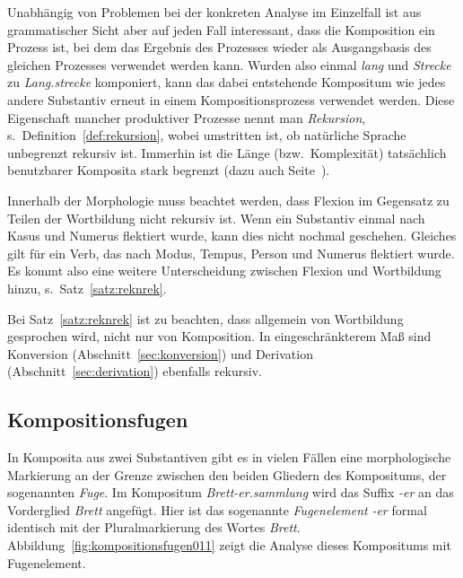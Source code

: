 Unabhängig von Problemen bei der konkreten Analyse im Einzelfall ist aus grammatischer Sicht aber auf jeden Fall interessant, dass die Komposition ein Prozess ist, bei dem das Ergebnis des Prozesses wieder als Ausgangsbasis des gleichen Prozesses verwendet werden kann.
Wurden also einmal \textit{lang} und \textit{Strecke} zu \textit{Lang.strecke} komponiert, kann das dabei entstehende Kompositum wie jedes andere Substantiv erneut in einem Kompositionsprozess verwendet werden.
Diese Eigenschaft mancher produktiver Prozesse nennt man \textit{Rekursion}, s.\ Definition~\ref{def:rekursion}, wobei umstritten ist, ob natürliche Sprache unbegrenzt rekursiv ist.
Immerhin ist die Länge (bzw.\ Komplexität) tatsächlich benutzbarer Komposita stark begrenzt (dazu auch Seite~\pageref{abs:syntaktischestruktur021}).


Innerhalb der Morphologie muss beachtet werden, dass Flexion im Gegensatz zu Teilen der Wortbildung nicht rekursiv ist.
Wenn ein Substantiv einmal nach Kasus und Numerus flektiert wurde, kann dies nicht nochmal geschehen.
Gleiches gilt für ein Verb, das nach Modus, Tempus, Person und Numerus flektiert wurde.
Es kommt also eine weitere Unterscheidung zwischen Flexion und Wortbildung hinzu, s.\ Satz~\ref{satz:reknrek}.


Bei Satz~\ref{satz:reknrek} ist zu beachten, dass allgemein von Wortbildung gesprochen wird, nicht nur von Komposition.
In eingeschränkterem Maß sind Konversion (Abschnitt~\ref{sec:konversion}) und Derivation (Abschnitt~\ref{sec:derivation}) ebenfalls rekursiv.

\subsection{Kompositionsfugen}
\label{sec:kompositionsfugen}


In Komposita aus zwei Substantiven gibt es in vielen Fällen eine morphologische Markierung an der Grenze zwischen den beiden Gliedern des Kompositums, der sogenannten \textit{Fuge}.
Im Kompositum \textit{Brett-er.sammlung} wird das Suffix \textit{-er} an das Vorderglied \textit{Brett} angefügt.
Hier ist das sogenannte \textit{Fugenelement} \textit{-er} formal identisch mit der Pluralmarkierung des Wortes \textit{Brett}.
Abbildung~\ref{fig:kompositionsfugen011} zeigt die Analyse dieses Kompositums mit Fugenelement.

